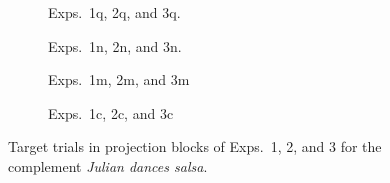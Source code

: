 \documentclass[11pt,fleqn]{article}
\newcommand{\6}{\mbox{$[\hspace*{-.6mm}[$}}
\newcommand{\9}{\mbox{$]\hspace*{-.6mm}]$}}
\begin{document}
\begin{figure}[h!]
\centering

\begin{subfigure}[t]{0.5\textwidth}
        \centering
{}
\caption{Exps.~1q, 2q, and 3q.}\label{fig-exp1q-projection}
\end{subfigure}%
\begin{subfigure}[t]{0.5\textwidth}
\centering
{} 
\caption{Exps.~1n, 2n, and 3n.}\label{fig-exp1n-projection}
 \end{subfigure}
\begin{subfigure}[t]{0.5\textwidth}
        \centering
{}
\caption{Exps.~1m, 2m, and 3m}\label{fig-exp1m-projection}
 \end{subfigure}%
\begin{subfigure}[t]{0.5\textwidth}
\centering
{} 
\caption{Exps.~1c, 2c, and 3c}\label{fig-exp1c-projection}
\end{subfigure}


\caption{Target trials in projection blocks of Exps.~1, 2, and 3 for the complement {\em Julian dances salsa}.}\label{f-projection-trials}
\end{figure}
\end{document}
